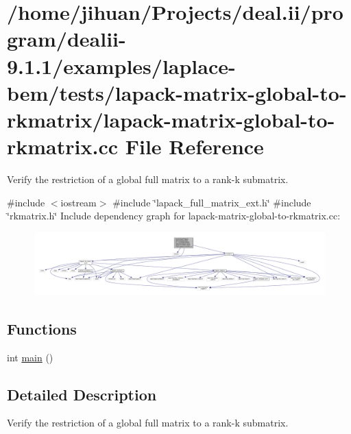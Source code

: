 \hypertarget{lapack-matrix-global-to-rkmatrix_8cc}{}\section{/home/jihuan/\+Projects/deal.ii/program/dealii-\/9.1.1/examples/laplace-\/bem/tests/lapack-\/matrix-\/global-\/to-\/rkmatrix/lapack-\/matrix-\/global-\/to-\/rkmatrix.cc File Reference}
\label{lapack-matrix-global-to-rkmatrix_8cc}


Verify the restriction of a global full matrix to a rank-\/k submatrix.  


{\ttfamily \#include $<$iostream$>$}\newline
{\ttfamily \#include \char`\"{}lapack\+\_\+full\+\_\+matrix\+\_\+ext.\+h\char`\"{}}\newline
{\ttfamily \#include \char`\"{}rkmatrix.\+h\char`\"{}}\newline
Include dependency graph for lapack-\/matrix-\/global-\/to-\/rkmatrix.cc\+:
\nopagebreak
\begin{figure}[H]
\begin{center}
\leavevmode
\includegraphics[width=350pt]{lapack-matrix-global-to-rkmatrix_8cc__incl}
\end{center}
\end{figure}
\subsection*{Functions}
\begin{DoxyCompactItemize}
\item 
int \hyperlink{lapack-matrix-global-to-rkmatrix_8cc_ae66f6b31b5ad750f1fe042a706a4e3d4}{main} ()
\end{DoxyCompactItemize}


\subsection{Detailed Description}
Verify the restriction of a global full matrix to a rank-\/k submatrix. 

